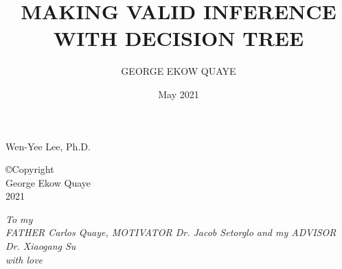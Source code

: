 \documentclass[12pt]{report}
\theoremstyle{definition}
\begin{document}
\setcounter{tocdepth}{2}


\title{MAKING VALID INFERENCE WITH DECISION TREE}

\author{GEORGE EKOW QUAYE}
\date{May 2021}

{Wen-Yee Lee, Ph.D.}



\makesigpage


\begin{CenteredPage}
	\copyright Copyright\\[0.2in]
	George Ekow Quaye\\[0.2in]
	2021
\end{CenteredPage}

\begin{CenteredPage}
	{\it To my\\[0.2in]
		FATHER Carlos  Quaye, MOTIVATOR  Dr. Jacob Setorglo and my ADVISOR Dr. Xiaogang Su \\[0.2in]
		with love}
\end{CenteredPage}
\end{document}
